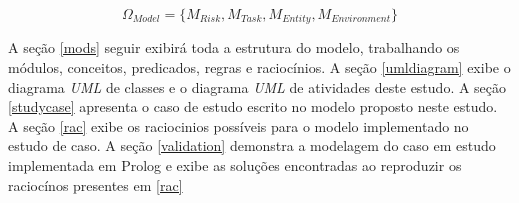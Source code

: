 \begin{equation} 
    \Omega_{Model} = \{ M_{Risk}, M_{Task}, M_{Entity}, M_{Environment}\}
\end{equation}
\label{modules}

A seção \ref{mods} seguir exibirá toda a estrutura do modelo, trabalhando os módulos, conceitos, predicados, regras e raciocínios. A seção \ref{umldiagram}
exibe o diagrama \textit{UML} de classes e o diagrama \textit{UML} de atividades deste estudo. A seção \ref{studycase} apresenta o caso de estudo escrito no 
modelo proposto neste estudo. A seção \ref{rac} exibe os raciocinios possíveis para o modelo implementado no estudo de caso. A seção \ref{validation} 
demonstra a modelagem do caso em estudo implementada em Prolog e exibe as soluções encontradas ao reproduzir os raciocínos presentes em \ref{rac}  